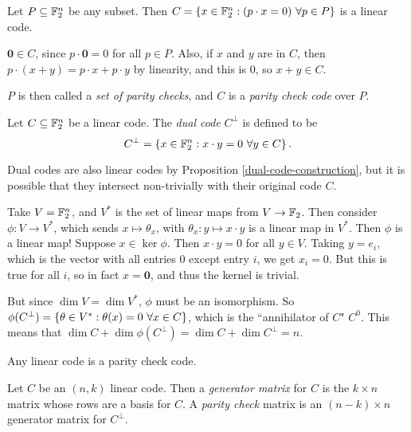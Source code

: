 \documentclass{article}
\begin{document}
\begin{proposition}
	\label{dual-code-construction}
    Let $P \subseteq \mathbb{F}_2^n$ be any subset. Then
	$C = \left\lbrace x \in \mathbb{F}_2^n : (p \cdot x = 0) \ \forall p \in P \right\rbrace$
	is a linear code.
\end{proposition}
\begin{prf}
    $\textbf{0} \in C$, since $p \cdot \mathbf{0} = 0$ for all $p \in P$.
    Also, if $x$ and $y$ are in $C$, then
    $p \cdot (x + y) = p \cdot x + p \cdot y$
    by linearity, and this is 0, so $x + y \in C$.
\end{prf}

\begin{note}
	$P$ is then called a \textit{set of parity checks},
	and $C$ is a \textit{parity check code} over $P$.
\end{note}

\begin{definition}
    Let $C \subseteq \mathbb{F}_2^n$ be a linear code.
    The \textit{dual code} $C^\bot$ is defined to be
    \[
	C^\bot = \left\lbrace x \in \mathbb{F}_2^n : x \cdot y = 0 \ \forall y \in C \right\rbrace.
	\]
\end{definition}

\begin{note}
	Dual codes are also linear codes by Proposition \ref{dual-code-construction},
	but it is possible that they intersect non-trivially with their original code $C$.
\end{note}

Take $V = \mathbb{F}_2^n$, and $V^*$ is the set of linear maps from $V \to \mathbb{F}_2$.
Then consider $\phi : V \to V^*$, which sends $x \mapsto \theta_x$,
with $\theta_x : y \mapsto x \cdot y$ is a linear map in $V^*$.
Then $\phi$ is a linear map!
Suppose $x \in \ker \phi$. Then $x \cdot y = 0$ for all $y \in V$.
Taking $y = e_i$, which is the vector with all entries 0 except entry $i$,
we get $x_i = 0$. But this is true for all $i$, so in fact $x = \textbf{0}$,
and thus the kernel is trivial.

But since $\dim V = \dim V^*$, $\phi$ must be an isomorphism.
So $\phi(C^\bot) = \left\lbrace \theta \in V^* : \theta(x) = 0 \ \forall x \in C \right\rbrace$,
which is the ``annihilator of $C$" $C^0$.
This means that
$\dim C + \dim \phi(C^\bot) = \dim C + \dim C^\bot = n$.

\begin{corollary}
    Any linear code is a parity check code.
\end{corollary}

\begin{definition}
	\label{generator-parity-check-matrix}
    Let $C$ be an $(n, k)$ linear code.
    Then a \textit{generator matrix} for $C$ is the $k \times n$ matrix whose rows are a basis for $C$. A \textit{parity check} matrix is an $(n-k) \times n$ generator matrix for $C^\bot$.
\end{definition}
\end{document}
